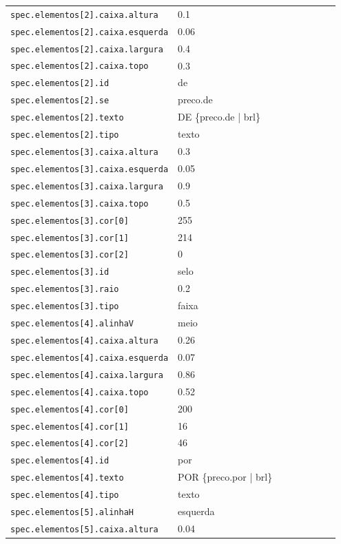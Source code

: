 \begin{tabular}{@{}p{0.35\linewidth}p{0.6\linewidth}@{}}
\texttt{spec.elementos[2].caixa.altura} & 0.1 \\
\texttt{spec.elementos[2].caixa.esquerda} & 0.06 \\
\texttt{spec.elementos[2].caixa.largura} & 0.4 \\
\texttt{spec.elementos[2].caixa.topo} & 0.3 \\
\texttt{spec.elementos[2].id} & de \\
\texttt{spec.elementos[2].se} & preco.de \\
\texttt{spec.elementos[2].texto} & DE \{preco.de | brl\} \\
\texttt{spec.elementos[2].tipo} & texto \\
\texttt{spec.elementos[3].caixa.altura} & 0.3 \\
\texttt{spec.elementos[3].caixa.esquerda} & 0.05 \\
\texttt{spec.elementos[3].caixa.largura} & 0.9 \\
\texttt{spec.elementos[3].caixa.topo} & 0.5 \\
\texttt{spec.elementos[3].cor[0]} & 255 \\
\texttt{spec.elementos[3].cor[1]} & 214 \\
\texttt{spec.elementos[3].cor[2]} & 0 \\
\texttt{spec.elementos[3].id} & selo \\
\texttt{spec.elementos[3].raio} & 0.2 \\
\texttt{spec.elementos[3].tipo} & faixa \\
\texttt{spec.elementos[4].alinhaV} & meio \\
\texttt{spec.elementos[4].caixa.altura} & 0.26 \\
\texttt{spec.elementos[4].caixa.esquerda} & 0.07 \\
\texttt{spec.elementos[4].caixa.largura} & 0.86 \\
\texttt{spec.elementos[4].caixa.topo} & 0.52 \\
\texttt{spec.elementos[4].cor[0]} & 200 \\
\texttt{spec.elementos[4].cor[1]} & 16 \\
\texttt{spec.elementos[4].cor[2]} & 46 \\
\texttt{spec.elementos[4].id} & por \\
\texttt{spec.elementos[4].texto} & POR \{preco.por | brl\} \\
\texttt{spec.elementos[4].tipo} & texto \\
\texttt{spec.elementos[5].alinhaH} & esquerda \\
\texttt{spec.elementos[5].caixa.altura} & 0.04 \\

\end{tabular}
